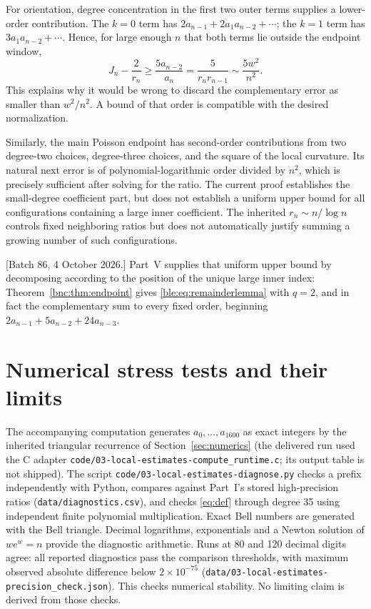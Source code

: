 \documentclass[11pt]{article}
\numberwithin{equation}{section}
\theoremstyle{definition}
\theoremstyle{remark}
\begin{document}
For orientation, degree concentration in the first two outer terms
supplies a lower-order contribution. The $k=0$ term has
$2a_{n-1}+2a_1a_{n-2}+\cdots$; the $k=1$ term has $3a_1a_{n-2}+\cdots$.
Hence, for large enough $n$ that both terms lie outside the endpoint
window,
\[
 J_n-\frac2{r_n}\ge\frac{5a_{n-2}}{a_n}
 =\frac5{r_nr_{n-1}}\sim\frac{5w^2}{n^2}.
\]
This explains why it would be wrong to discard the complementary error as
smaller than $w^2/n^2$. A bound of that order is compatible with the
desired normalization.

Similarly, the main Poisson endpoint has second-order contributions from
two degree-two choices, degree-three choices, and the square of the local
curvature. Its natural next error is of polynomial-logarithmic order
divided by $n^2$, which is precisely sufficient after solving for the
ratio. The current proof establishes the small-degree coefficient part,
but does not establish a uniform upper bound for all configurations
containing a large inner coefficient. The inherited $r_n\sim n/\log n$
controls fixed neighboring ratios but does not automatically justify
summing a growing number of such configurations.

[Batch 86, 4 October 2026.] Part~V supplies that uniform upper bound by decomposing
according to the position of the unique large inner index:
Theorem~\ref{bnc:thm:endpoint} gives \eqref{ble:eq:remainderlemma} with
$q=2$, and in fact the complementary sum to every fixed order, beginning
$2a_{n-1}+5a_{n-2}+24a_{n-3}$.

\section{Numerical stress tests and their limits}\label{ble:sec:numerics}
The accompanying computation generates $a_0,\ldots,a_{1600}$ as exact
integers by the inherited triangular recurrence of
Section~\ref{sec:numerics} (the delivered run used the C adapter
\nolinkurl{code/03-local-estimates-compute_runtime.c}; its output table is
not shipped). The script \nolinkurl{code/03-local-estimates-diagnose.py}
checks a prefix independently with Python, compares against Part~I's
stored high-precision ratios (\nolinkurl{data/diagnostics.csv}), and checks
\eqref{eq:def} through degree 35 using independent finite polynomial
multiplication. Exact Bell numbers are generated with the Bell triangle.
Decimal logarithms, exponentials and a Newton solution of $we^w=n$ provide
the diagnostic arithmetic. Runs at 80 and 120 decimal digits agree: all
reported diagnostics pass the comparison thresholds, with maximum observed
absolute difference below $2\times10^{-75}$
(\nolinkurl{data/03-local-estimates-precision_check.json}). This checks
numerical stability. No limiting claim is derived from those checks.
\end{document}
